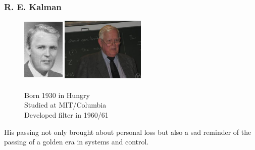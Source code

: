 \documentclass[14pt,hyperref={CJKbookmarks=true}]{beamer}
\theoremstyle{plain}
\theoremstyle{definition}
\theoremstyle{remark}
\begin{document}
\begin{frame}
\small
\frametitle{R. E. Kalman}
\small
\begin{figure}
\centering
\begin{minipage}[t]{0.3\textwidth}
\centering
\includegraphics[width=2cm,height=3cm]{kalman0.jpg}
\end{minipage}
\begin{minipage}[t]{0.3\textwidth}
\centering
\includegraphics[width=4cm,height=3cm]{kalman.jpg}
\end{minipage}
\caption{\\Born 1930 in Hungry\\
Studied at MIT/Columbia\\
Developed filter in 1960/61}
\label{fig:graph}
\end{figure}
\begin{displayquote}
His passing not only brought about personal loss but also a sad  reminder of the passing of a golden era in systems and control.
\end{displayquote}

\end{frame}
\end{document}

